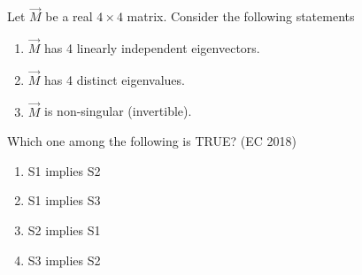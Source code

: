 \item Let $\vec{M}$ be a real $4 \times 4$ matrix. Consider the following statements
	\begin{enumerate}[label=S\arabic*:]
		\item $\vec{M}$ has 4 linearly independent eigenvectors.
		\item $\vec{M}$ has 4 distinct eigenvalues.
		\item $\vec{M}$ is non-singular (invertible).
\end{enumerate}
Which one among the following is TRUE?
\hfill(EC 2018)
\begin{multicols}{4}
\begin{enumerate}
\item S1 implies S2
\item S1 implies S3
\item S2 implies S1
\item S3 implies S2
\end{enumerate}
\end{multicols}

